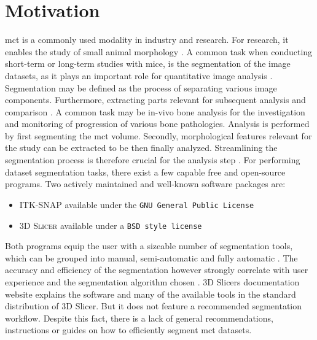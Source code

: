 \section{Motivation}
\label{s:introduction-motivation}
\acrfull{mct} is a commonly used modality in industry and research.
For research, it enables the study of small animal morphology \cite{percianoInsight3DMicroCT2017}.
A common task when conducting short-term or long-term studies with mice, is the segmentation of the image datasets, as it plays an important role for quantitative image analysis \cite{sheppardTechniquesHelicalScanning2014}.
Segmentation may be defined as the process of separating various image components.
Furthermore, extracting parts relevant for subsequent analysis and comparison \cite{percianoInsight3DMicroCT2017}.
A common task may be in-vivo bone analysis for the investigation and monitoring of progression of various bone pathologies.
Analysis is performed by first segmenting the \acrshort{mct} volume.
Secondly, morphological features relevant for the study can be extracted to be then finally analyzed.
Streamlining the segmentation process is therefore crucial for the analysis step \cite{percianoInsight3DMicroCT2017,korfiatisIndependentActiveContours2017}.
\newline
For performing \mct\space dataset segmentation tasks, there exist a few capable free and open-source programs.
Two actively maintained and well-known \cite{virziComprehensiveReview3D2020,mandoliniComparisonThree3D2022,virziComprehensiveReview3D2020} software packages are:
\begin{itemize}
	\item \textsc{ITK-SNAP} \cite{yushkevichUserguided3DActive2006} available under the \texttt{GNU General Public License} \cite{licenseGnuGeneralPublic1989}
	\item \textsc{3D Slicer} \cite{kikinis3DSlicerPlatform2014} available under a \texttt{BSD style license} \cite{gaudeulPublicProvisionPrivate2005}
\end{itemize}
Both programs equip the user with a sizeable number of segmentation tools, which can be grouped into manual, semi-automatic and fully automatic \cite{percianoInsight3DMicroCT2017}.
The accuracy and efficiency of the segmentation however strongly correlate with user experience and the segmentation algorithm chosen \cite{mandoliniComparisonThree3D2022,aydinRELIABILITYREPRODUCIBILITYTIMEEFFICIENCY2020,arguelloComparisonSegmentationTools2019}.
3D Slicers documentation website \cite{pinterPolymorphSegmentationRepresentation2019} explains the software and many of the available tools in the standard distribution of 3D Slicer.
But it does not feature a recommended segmentation workflow.
Despite this fact, there is a lack of general recommendations, instructions or guides on how to efficiently segment \acrlong{mct} datasets.

